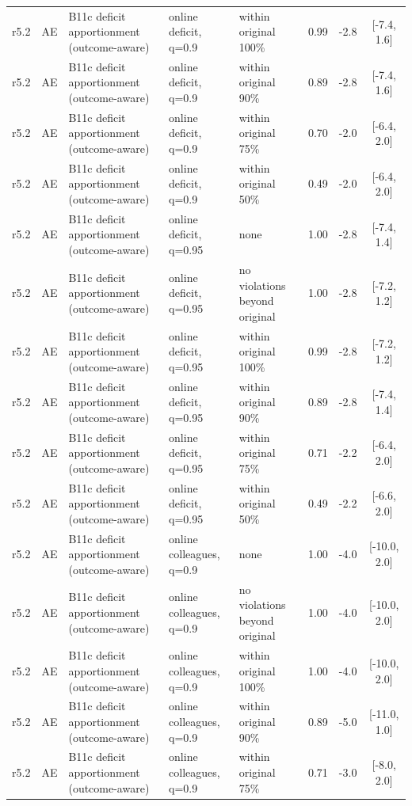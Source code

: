\documentclass[10pt,onecolumn,letterpaper]{article}
\begin{document}
\begin{longtable}{lllp{4.2cm}p{3.4cm}ccc}
r5.2 & AE & B11c deficit apportionment (outcome-aware) & online deficit, q=0.9 & within original 100\% & 0.99 & -2.8 & [-7.4, 1.6] \\
r5.2 & AE & B11c deficit apportionment (outcome-aware) & online deficit, q=0.9 & within original 90\% & 0.89 & -2.8 & [-7.4, 1.6] \\
r5.2 & AE & B11c deficit apportionment (outcome-aware) & online deficit, q=0.9 & within original 75\% & 0.70 & -2.0 & [-6.4, 2.0] \\
r5.2 & AE & B11c deficit apportionment (outcome-aware) & online deficit, q=0.9 & within original 50\% & 0.49 & -2.0 & [-6.4, 2.0] \\
r5.2 & AE & B11c deficit apportionment (outcome-aware) & online deficit, q=0.95 & none & 1.00 & -2.8 & [-7.4, 1.4] \\
r5.2 & AE & B11c deficit apportionment (outcome-aware) & online deficit, q=0.95 & no violations beyond original & 1.00 & -2.8 & [-7.2, 1.2] \\
r5.2 & AE & B11c deficit apportionment (outcome-aware) & online deficit, q=0.95 & within original 100\% & 0.99 & -2.8 & [-7.2, 1.2] \\
r5.2 & AE & B11c deficit apportionment (outcome-aware) & online deficit, q=0.95 & within original 90\% & 0.89 & -2.8 & [-7.4, 1.4] \\
r5.2 & AE & B11c deficit apportionment (outcome-aware) & online deficit, q=0.95 & within original 75\% & 0.71 & -2.2 & [-6.4, 2.0] \\
r5.2 & AE & B11c deficit apportionment (outcome-aware) & online deficit, q=0.95 & within original 50\% & 0.49 & -2.2 & [-6.6, 2.0] \\
r5.2 & AE & B11c deficit apportionment (outcome-aware) & online colleagues, q=0.9 & none & 1.00 & -4.0 & [-10.0, 2.0] \\
r5.2 & AE & B11c deficit apportionment (outcome-aware) & online colleagues, q=0.9 & no violations beyond original & 1.00 & -4.0 & [-10.0, 2.0] \\
r5.2 & AE & B11c deficit apportionment (outcome-aware) & online colleagues, q=0.9 & within original 100\% & 1.00 & -4.0 & [-10.0, 2.0] \\
r5.2 & AE & B11c deficit apportionment (outcome-aware) & online colleagues, q=0.9 & within original 90\% & 0.89 & -5.0 & [-11.0, 1.0] \\
r5.2 & AE & B11c deficit apportionment (outcome-aware) & online colleagues, q=0.9 & within original 75\% & 0.71 & -3.0 & [-8.0, 2.0] \\

\end{longtable}
\end{document}
